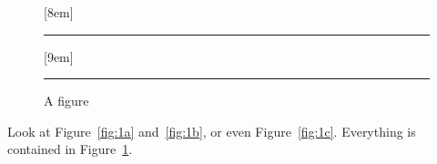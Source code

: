 \documentclass{article}
\begin{document}
\begin{figure}
  \hfill{}[8em]{\centering \rule{5pt}{3em}}
  \hfill{}
  \hfill{}[9em]{\centering \rule{2em}{4em}}
  \hfill\null
  \caption{A figure}\label{fig:1}
\end{figure}
Look at Figure~\ref{fig:1a} and~\ref{fig:1b}, or even Figure~\ref{fig:1c}. Everything is contained in Figure~\ref{fig:1}.
\end{document}
